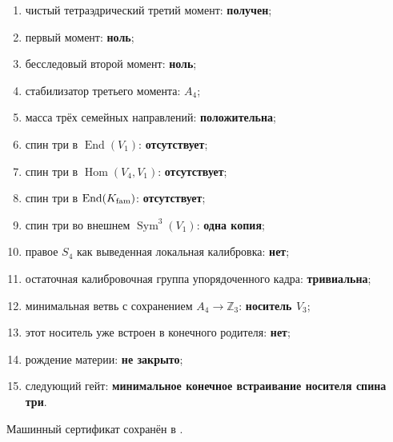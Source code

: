 \begin{protocol}
\begin{enumerate}
 \item чистый тетраэдрический третий момент: \textbf{получен};
 \item первый момент: \textbf{ноль};
 \item бесследовый второй момент: \textbf{ноль};
 \item стабилизатор третьего момента: \textbf{$A_4$};
 \item масса трёх семейных направлений: \textbf{положительна};
 \item спин три в $\operatorname{End}(V_1)$: \textbf{отсутствует};
 \item спин три в $\operatorname{Hom}(V_4,V_1)$: \textbf{отсутствует};
 \item спин три в $\operatorname{End}(K_{\rm fam})$: \textbf{отсутствует};
 \item спин три во внешнем $\operatorname{Sym}^3(V_1)$: \textbf{одна копия};
 \item правое $S_4$ как выведенная локальная калибровка:
 \textbf{нет};
 \item остаточная калибровочная группа упорядоченного кадра:
 \textbf{тривиальна};
 \item минимальная ветвь с сохранением $A_4\to\mathbb Z_3$:
 \textbf{носитель $V_3$};
 \item этот носитель уже встроен в конечного родителя: \textbf{нет};
 \item рождение материи: \textbf{не закрыто};
 \item следующий гейт: \textbf{минимальное конечное встраивание
 носителя спина три}.
\end{enumerate}
\end{protocol}

Машинный сертификат сохранён в
.